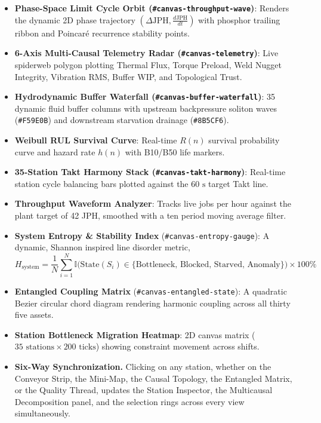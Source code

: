 \documentclass[11pt]{article}
\begin{document}
\begin{itemize}[leftmargin=1.2cm]
    \item \textbf{Phase-Space Limit Cycle Orbit (\texttt{\#canvas-throughput-wave})}: Renders the dynamic 2D phase trajectory $(\Delta\text{JPH}, \frac{d\text{JPH}}{dt})$ with phosphor trailing ribbon and Poincar\'e recurrence stability points.
    \item \textbf{6-Axis Multi-Causal Telemetry Radar (\texttt{\#canvas-telemetry})}: Live spiderweb polygon plotting Thermal Flux, Torque Preload, Weld Nugget Integrity, Vibration RMS, Buffer WIP, and Topological Trust.
    \item \textbf{Hydrodynamic Buffer Waterfall (\texttt{\#canvas-buffer-waterfall})}: 35 dynamic fluid buffer columns with upstream backpressure soliton waves (\texttt{\#F59E0B}) and downstream starvation drainage (\texttt{\#8B5CF6}).
    \item \textbf{Weibull RUL Survival Curve}: Real-time $R(n)$ survival probability curve and hazard rate $h(n)$ with B10/B50 life markers.
    \item \textbf{35-Station Takt Harmony Stack (\texttt{\#canvas-takt-harmony})}: Real-time station cycle balancing bars plotted against the $60\text{ s}$ target Takt line.
    \item \textbf{Throughput Waveform Analyzer}: Tracks live jobs per hour against the plant target of 42 JPH, smoothed with a ten period moving average filter.
    \item \textbf{System Entropy \& Stability Index} (\texttt{\#canvas-entropy-gauge}): A dynamic, Shannon inspired line disorder metric,
    \begin{equation}
    H_{\text{system}} = \frac{1}{N}\sum_{i=1}^{N} \mathbb{I}\big(\text{State}(S_i) \in \{\text{Bottleneck, Blocked, Starved, Anomaly}\}\big) \times 100\%
    \end{equation}
    \item \textbf{Entangled Coupling Matrix} (\texttt{\#canvas-entangled-state}): A quadratic Bezier circular chord diagram rendering harmonic coupling across all thirty five assets.
    \item \textbf{Station Bottleneck Migration Heatmap}: 2D canvas matrix ($35\text{ stations} \times 200\text{ ticks}$) showing constraint movement across shifts.
    \item \textbf{Six-Way Synchronization.} Clicking on any station, whether on the Conveyor Strip, the Mini-Map, the Causal Topology, the Entangled Matrix, or the Quality Thread, updates the Station Inspector, the Multicausal Decomposition panel, and the selection rings across every view simultaneously.
\end{itemize}
\end{document}
